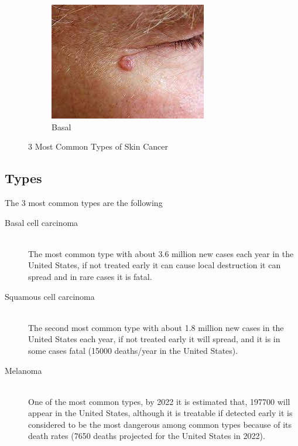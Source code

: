 \begin{figure}[h]
            \begin{subfigure}[b]{0.3\textwidth}
                \centering
                \includegraphics[scale=.5]{./chapter-01-general-medical-information/basal.jpeg}
                \caption{Basal ~\cite{epr2021}}
                \label{fig:basal}
            \end{subfigure}
        \caption{3 Most Common Types of Skin Cancer}
        \label{fig:3types}
        \end{figure}


    \subsection{Types}
        The 3 most common types are the following ~\cite{scf2022}
        \begin{description}
        \item[Basal cell carcinoma] \hfill \\
            The most common type with about 3.6 million new cases each year in the United States, if not treated early it can cause local destruction it can spread and in rare cases it is fatal.
        \item[Squamous cell carcinoma] \hfill \\
            The second most common type with about 1.8 million new cases in the United States each year, if not treated early it will spread, and it is in some cases fatal (15000 deaths/year in the United States).
        \item[Melanoma] \hfill \\
            One of the most common types, by 2022 it is estimated that, 197700 will appear in the United States, although it is treatable if detected early it is considered to be the most dangerous among common types because of its death rates (7650 deaths projected for the United States in 2022).
        \end{description}



